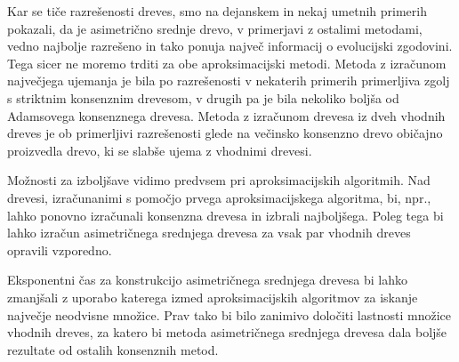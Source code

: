 \documentclass[a4paper, 12pt]{book}
\begin{document}
Kar se tiče razrešenosti dreves, smo na dejanskem in nekaj umetnih primerih pokazali, da 
je asimetrično srednje drevo, v primerjavi z ostalimi metodami, vedno najbolje razrešeno in tako ponuja največ 
informacij o evolucijski zgodovini. 
Tega sicer ne moremo trditi za obe aproksimacijski metodi. Metoda z izračunom 
največjega ujemanja je bila po razrešenosti v nekaterih primerih primerljiva zgolj 
s striktnim konsenznim drevesom, v drugih pa je bila nekoliko boljša od Adamsovega 
konsenznega drevesa. Metoda z izračunom drevesa iz dveh vhodnih dreves je ob 
primerljivi razrešenosti glede na večinsko konsenzno drevo običajno proizvedla drevo,
ki se slabše ujema z vhodnimi drevesi. 

Možnosti za izboljšave vidimo predvsem pri aproksimacijskih algoritmih. Nad drevesi,
izračunanimi s pomočjo prvega aproksimacijskega algoritma, bi, npr., lahko ponovno 
izračunali konsenzna drevesa in izbrali najboljšega. Poleg tega bi lahko
izračun asimetričnega srednjega drevesa za vsak par vhodnih dreves opravili vzporedno. 

Eksponentni čas za konstrukcijo asimetričnega srednjega drevesa bi lahko zmanjšali z 
uporabo katerega izmed aproksimacijskih algoritmov za iskanje največje neodvisne množice.
Prav tako bi bilo zanimivo določiti lastnosti množice vhodnih dreves, za katero bi 
metoda asimetričnega srednjega drevesa dala boljše rezultate od ostalih konsenznih metod.
\end{document}
